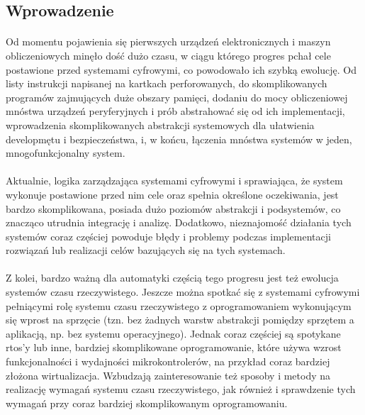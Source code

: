 \documentclass[../main]{subfiles}
\begin{document}
\subsection{Wprowadzenie}

\paragraph{}
Od momentu pojawienia się  pierwszych urządzeń elektronicznych i maszyn
obliczeniowych minęło dość dużo czasu, w ciągu którego progres pchał  cele
postawione przed systemami cyfrowymi, co powodowało ich szybką ewolucję. Od listy instrukcji napisanej
na kartkach perforowanych, do skomplikowanych programów zajmujących duże obszary pamięci, dodaniu do
mocy obliczeniowej mnóstwa urządzeń peryferyjnych i prób abstrahować się od ich implementacji,
wprowadzenia skomplikowanych abstrakcji systemowych dla ułatwienia developmętu  i
bezpieczeństwa, i, w końcu, łączenia mnóstwa systemów w jeden, mnogofunkcjonalny system.

\paragraph{}
Aktualnie, logika zarządzająca systemami cyfrowymi i sprawiająca, że system wykonuje postawione przed
nim cele oraz spełnia określone oczekiwania, jest bardzo skomplikowana, posiada dużo poziomów
abstrakcji i podsystemów, co znacząco utrudnia integrację i analizę. Dodatkowo, nieznajomość działania
 tych systemów coraz częściej powoduje błędy i problemy podczas
implementacji rozwiązań lub realizacji celów bazujących się na tych systemach.

\paragraph{}
Z kolei, bardzo ważną dla automatyki częścią tego progresu jest też ewolucja systemów czasu
rzeczywistego. Jeszcze można spotkać się z systemami cyfrowymi pełniącymi rolę systemu czasu
rzeczywistego z oprogramowaniem wykonującym się wprost na sprzęcie (tzn. bez żadnych warstw abstrakcji
pomiędzy sprzętem a aplikacją, np. bez systemu operacyjnego). Jednak coraz częściej są spotykane
\acrshort{rtos}'y lub inne, bardziej skomplikowane oprogramowanie, które używa wzrost funkcjonalności i
wydajności  mikrokontrolerów, na przykład coraz bardziej złożona wirtualizacja.
Wzbudzają zainteresowanie też sposoby i metody na realizację wymagań systemu czasu rzeczywistego, jak
również i sprawdzenie tych wymagań przy coraz bardziej skomplikowanym oprogramowaniu.
\end{document}
